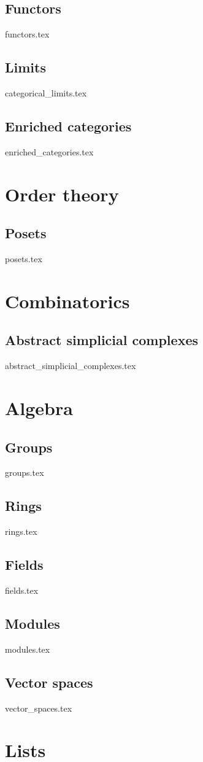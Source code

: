 \documentclass[numbers=endperiod, bibliography=totocnumbered]{scrartcl}
\begin{document}
\subsection{Functors}\label{sec:functors}
{functors.tex}
\subsection{Limits}\label{sec:categorical_limits}
{categorical_limits.tex}
\subsection{Enriched categories}\label{sec:enriched_categories}
{enriched_categories.tex}

\section{Order theory}\label{sec:order_theory}
\subsection{Posets}\label{sec:posets}
{posets.tex}

\section{Combinatorics}\label{sec:combinatorics}
\subsection{Abstract simplicial complexes}\label{sec:abstract_simplicial_complexes}
{abstract_simplicial_complexes.tex}

\section{Algebra}\label{sec:algebra}
\subsection{Groups}\label{sec:groups}
{groups.tex}
\subsection{Rings}\label{sec:rings}
{rings.tex}
\subsection{Fields}\label{sec:fields}
{fields.tex}
\subsection{Modules}\label{sec:modules}
{modules.tex}
\subsection{Vector spaces}\label{sec:vector_spaces}
{vector_spaces.tex}

\section{Lists}

\listofaoc\label{list:aoc}
\listoflem\label{list:lem}
\listofusc\label{list:usc}

\printbibliography
\end{document}
